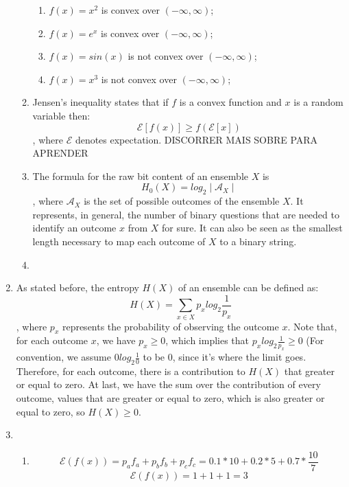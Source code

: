 \documentclass{article}
\begin{document}
\begin{enumerate}
\begin{enumerate}
		            \begin{enumerate}
			            \item \(f(x) = x^2\) is convex over \((-\infty, \infty)\);
			            \item \(f(x) = e^x\) is convex over \((-\infty, \infty)\);
			            \item \(f(x) = sin(x)\) is not convex over \((-\infty, \infty)\);
			            \item \(f(x) = x^3\) is not convex over \((-\infty, \infty)\);
		            \end{enumerate}
		      \item Jensen's inequality states that if \(f\) is a convex function and \(x\) is a random variable then:
		            \[\mathcal{E}[f(x)] \geq f(\mathcal{E}[x])\],
		            where \(\mathcal{E}\) denotes expectation. DISCORRER MAIS SOBRE PARA APRENDER
		      \item The formula for the raw bit content of an ensemble \(X\) is
		            \[H_0(X) = log_2 \mid \mathcal{A}_X \mid\],
		            where \(\mathcal{A}_X\) is the set of possible outcomes of the ensemble \(X\). It represents, in general, the number of binary questions that are needed to identify an outcome \(x\) from \(X\) for sure. It can also be seen as the smallest length necessary to map each outcome of \(X\) to a binary string.
		      \item
	      \end{enumerate}

	\item As stated before, the entropy \(H(X)\) of an ensemble can be defined as:
	      \[H(X) = \sum_{x \in X} p_x log_2 \frac{1}{p_x}\],
	      where \(p_x\) represents the probability of observing the outcome \(x\).
	      Note that, for each outcome \(x\), we have \(p_x \geq 0\), which implies that \(p_x log_2 \frac{1}{p_x} \geq 0\) (For convention, we assume \(0 log_2 \frac{1}{0}\) to be \(0\), since it's where the limit goes. Therefore, for each outcome, there is a contribution to \(H(X)\) that greater or equal to zero. At last, we have the sum over the contribution of every outcome, values that are greater or equal to zero, which is also greater or equal to zero, so \(H(X) \geq 0\).
	\item \begin{enumerate}

		      \item
		            \[\mathcal{E}(f(x)) = p_a f_a + p_b f_b + p_c f_c = 0.1 * 10 + 0.2 * 5 + 0.7 * \frac{10}{7}\]
		            \[\mathcal{E}(f(x)) = 1 + 1 + 1 = 3\]


\end{enumerate}
\end{enumerate}
\end{document}
